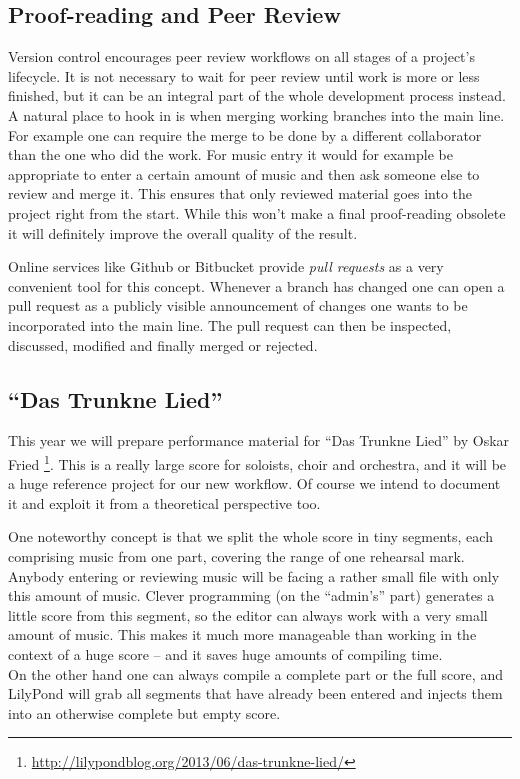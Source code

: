\documentclass[11pt,a4paper]{article}
\begin{document}
\subsection{Proof-reading and Peer Review}\label{sec:proof-reading-and-peer-review}
Version control encourages peer review workflows on all stages of a project's lifecycle.
It is not necessary to wait for peer review until work is more or less finished, but it
can be an integral part of the whole development process instead. A natural place to hook
in is when merging working branches into the main line. For example one can require the
merge to be done by a different collaborator than the one who did the work. For music entry
it would for example be appropriate to enter a certain amount of music and then ask someone
else to review and merge it.
This ensures that only reviewed material goes into the project right from the
start. While this won't make a final proof-reading obsolete it will definitely improve
the overall quality of the result.

Online services like Github or Bitbucket provide \emph{pull requests} as a very convenient
tool for this concept. Whenever a branch has changed one can open a pull request as a
publicly visible announcement of changes one wants to be incorporated into the main line.
The pull request can then be inspected, discussed, modified and finally merged or rejected.

\subsection{“Das Trunkne Lied”}
This year we will prepare performance material for “Das Trunkne Lied” by Oskar Fried%
\footnote{\url{http://lilypondblog.org/2013/06/das-trunkne-lied/}}.
This is a really large score for soloists, choir and orchestra, and it will be a
huge reference project for our new workflow. Of course we intend to document it
and exploit it from a theoretical perspective too.

One noteworthy concept is that we split the whole score in tiny segments, each comprising
music from one part, covering the range of one rehearsal mark. Anybody entering or
reviewing music will be facing a rather small file with only this amount of music.
Clever programming (on the “admin's” part) generates a little score from this segment, so
the editor can always work with a very small amount of music. This makes it much more
manageable than working in the context of a huge score -- and it saves huge amounts of
compiling time.\\
On the other hand one can always compile a complete part or the full score, and LilyPond
will grab all segments that have already been entered and injects them into an otherwise
complete but empty score.
\end{document}
